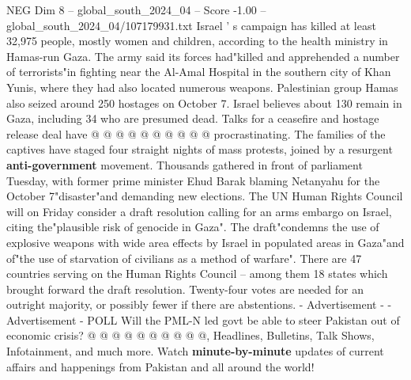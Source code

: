 \begin{textsample}{NEG Dim 8 – global\_south\_2024\_04 – Score -1.00 – global\_south\_2024\_04/107179931.txt}
Israel ' s campaign has killed at least 32,975 people, mostly women and children, according to the health ministry in Hamas-run Gaza.
The army said its forces had"killed and apprehended a number of terrorists"in fighting near the Al-Amal Hospital in the southern city of Khan Yunis, where they had also located numerous weapons.
Palestinian group Hamas also seized around 250 hostages on October 7.
Israel believes about 130 remain in Gaza, including 34 who are presumed dead.
Talks for a ceasefire and hostage release deal have @ @ @ @ @ @ @ @ @ @ procrastinating.
The families of the captives have staged four straight nights of mass protests, joined by a resurgent \textbf{anti-government} movement.
Thousands gathered in front of parliament Tuesday, with former prime minister Ehud Barak blaming Netanyahu for the October 7"disaster"and demanding new elections.
The UN Human Rights Council will on Friday consider a draft resolution calling for an arms embargo on Israel, citing the"plausible risk of genocide in Gaza".
The draft"condemns the use of explosive weapons with wide area effects by Israel in populated areas in Gaza"and of"the use of starvation of civilians as a method of warfare".
There are 47 countries serving on the Human Rights Council -- among them 18 states which brought forward the draft resolution.
Twenty-four votes are needed for an outright majority, or possibly fewer if there are abstentions. - Advertisement - - Advertisement - POLL Will the PML-N led govt be able to steer Pakistan out of economic crisis? @ @ @ @ @ @ @ @ @ @, Headlines, Bulletins, Talk Shows, Infotainment, and much more.
Watch \textbf{minute-by-minute} updates of current affairs and happenings from Pakistan and all around the world!

\end{textsample}
